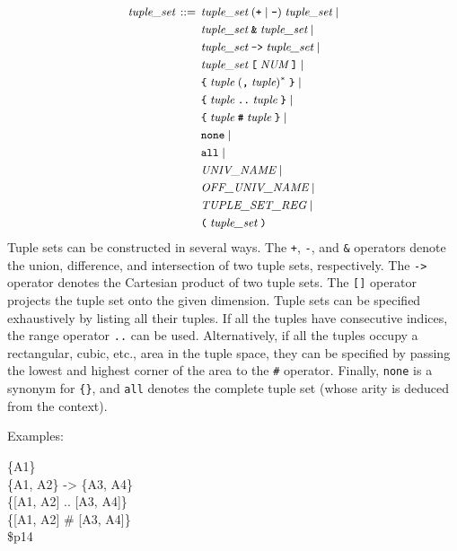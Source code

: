 \documentclass[a4paper,12pt]{article}
\begin{document}
    $$\small\begin{aligned}
                \textit{tuple\_set} \,::=\,{}
                & \textit{tuple\_set}\; (\verb|+| \mid \verb|-|)\; \textit{tuple\_set} \mid \\
                & \textit{tuple\_set}\; \verb|&|\; \textit{tuple\_set} \mid \\
                & \textit{tuple\_set}\; \verb|->|\; \textit{tuple\_set} \mid \\
                & \textit{tuple\_set}\; \verb|[|\; \textit{NUM}\; \verb|]| \mid \\
                & \verb|{|\; \textit{tuple}\; (\verb|,|\; \textit{tuple})^*\; \verb|}| \mid \\
                & \verb|{|\; \textit{tuple}\; \verb|..|\; \textit{tuple}\; \verb|}| \mid \\
                & \verb|{|\; \textit{tuple}\; \verb|#|\; \textit{tuple}\; \verb|}| \mid \\
                & \verb|none| \mid \\
                & \verb|all| \mid \\
                & \textit{UNIV\_NAME} \mid \\
                & \textit{OFF\_UNIV\_NAME} \mid \\
                & \textit{TUPLE\_SET\_REG} \mid \\
                & \verb|(|\; \textit{tuple\_set}\; \verb|)|
    \end{aligned}$$
%
    Tuple sets can be constructed in several ways. The \verb|+|, \verb|-|, and
    \verb|&| operators denote the union, difference, and intersection of two tuple
    sets, respectively. The \verb|->| operator denotes the Cartesian product of two
    tuple sets. The \verb|[]| operator projects the tuple set onto the given
    dimension. Tuple sets can be specified exhaustively by listing all their tuples.
    If all the tuples have consecutive indices, the range operator \verb|..| can be
    used. Alternatively, if all the tuples occupy a rectangular, cubic, etc., area
    in the tuple space, they can be specified by passing the lowest and highest
    corner of the area to the \verb|#| operator. Finally, \verb|none| is a synonym
    for \verb|{}|, and \verb|all| denotes the complete tuple set (whose arity is
    deduced from the context).

    Examples:

    \pre
    \ttfamily\small
    \{A1\} \\
    \{A1, A2\} -> \{A3, A4\} \\
    \{[A1, A2] {.}{.} [A3, A4]\} \\
    \{[A1, A2] \# [A3, A4]\} \\
    \$p14
    \post
\end{document}
